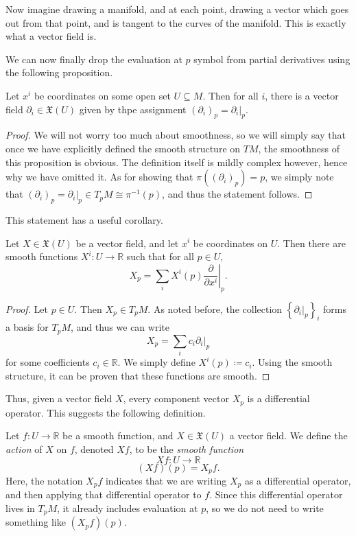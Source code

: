 Now imagine drawing a manifold, and at each point, drawing a vector which goes out from that point, and is tangent to the curves of the manifold. This is exactly what a vector field is.

We can now finally drop the evaluation at $p$ symbol from partial derivatives using the following proposition.

\begin{proposition}\label{prp:3-3}
	Let $x^i$ be coordinates on some open set $U\subseteq M$. Then for all $i$, there is a vector field $\partial _i\in \mathfrak{X} (U)$ given by thpe assignment $(\partial _i)_p = \partial _i|_p$.
\end{proposition}
\begin{proof}
	We will not worry too much about smoothness, so we will simply say that once we have explicitly defined the smooth structure on $TM$, the smoothness of this proposition is obvious. The definition itself is mildly complex however, hence why we have omitted it. As for showing that $\pi ((\partial _i)_p) = p$, we simply note that $(\partial _i)_p = \partial _i|_p \in T_pM \cong \pi ^{-1} (p)$, and thus the statement follows.
\end{proof}

This statement has a useful corollary.

\begin{corollary}\label{cor:3-4}
	Let $X\in \mathfrak{X} (U)$ be a vector field, and let $x^i$ be coordinates on $U$. Then there are smooth functions $X^i : U \to \mathbb{R} $ such that for all $p\in U$,
	\[
		X_p = \sum_{i} X^i(p)\left.\frac{\partial }{\partial x^i} \right|_p
	.\]
\end{corollary}
\begin{proof}
	Let $p\in U$. Then $X_p\in T_pM$. As noted before, the collection $\left\{ \partial _i|_p \right\} _{i} $ forms a basis for $T_pM$, and thus we can write
	\[
		X_p = \sum_{i} c_i \partial _i|_p
	\]
	for some coefficients $c_i\in\mathbb{R} $. We simply define $X^i(p) \coloneqq c_i$. Using the smooth structure, it can be proven that these functions are smooth.
\end{proof}

Thus, given a vector field $X$, every component vector $X_p$ is a differential operator. This suggests the following definition.

\begin{definition}\label{dfn:3-5}
	Let $f : U \to \mathbb{R} $ be a smooth function, and $X\in \mathfrak{X} (U)$ a vector field. We define the \emph{action} of $X$ on $f$, denoted $Xf$, to be the \emph{smooth function}
	\[
		Xf : U \to \mathbb{R} 
	\]
	\[
		(Xf)(p) = X_p f
	.\]
	Here, the notation $X_pf$ indicates that we are writing $X_p$ as a differential operator, and then applying that differential operator to $f$. Since this differential operator lives in $T_pM$, it already includes evaluation at $p$, so we do not need to write something like $(X_pf)(p)$.
\end{definition}

